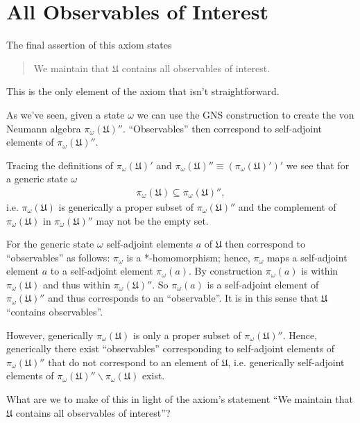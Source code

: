 \section{All Observables of Interest}\label{sctn:all-observables-of-interest}
The final assertion of this axiom states
\begin{quote}
    We maintain that $\mathfrak{U}$ contains all observables of interest.
\end{quote}
This is the only element of the axiom that isn't straightforward.

As we've seen, given a state $\omega$ we can use the GNS construction to create the von Neumann algebra $\pi_\omega(\mathfrak{U})''$. ``Observables'' then correspond to self-adjoint elements of $\pi_\omega(\mathfrak{U})''$.

Tracing the definitions of $\pi_\omega(\mathfrak{U})'$ and $\pi_\omega(\mathfrak{U})'' \equiv (\pi_\omega(\mathfrak{U})')'$ we see that for a generic state $\omega$
\begin{align}
    \pi_\omega(\mathfrak{U}) \subseteq \pi_\omega(\mathfrak{U})'',
\end{align}
i.e. $\pi_\omega(\mathfrak{U})$ is generically a proper subset of $\pi_\omega(\mathfrak{U})''$ and the complement of $\pi_\omega(\mathfrak{U})$ in $\pi_\omega(\mathfrak{U})''$ may not be the empty set.

For the generic state $\omega$ self-adjoint elements $a$ of $\mathfrak{U}$ then correspond to ``observables'' as follows: $\pi_\omega$ is a *-homomorphism; hence, $\pi_\omega$ maps a self-adjoint element $a$ to a self-adjoint element $\pi_\omega(a)$. By construction $\pi_\omega(a)$ is within $\pi_\omega(\mathfrak{U})$ and thus within $\pi_\omega(\mathfrak{U})''$. So $\pi_\omega(a)$ is a self-adjoint element of $\pi_\omega(\mathfrak{U})''$ and thus corresponds to an ``observable''. It is in this sense that $\mathfrak{U}$ ``contains observables''.

However, generically $\pi_\omega(\mathfrak{U})$ is only a proper subset of $\pi_\omega(\mathfrak{U})''$. Hence, generically there exist ``observables'' corresponding to self-adjoint elements of $\pi_\omega(\mathfrak{U})''$ that do not correspond to an element of $\mathfrak{U}$, i.e. generically self-adjoint elements of $\pi_\omega(\mathfrak{U})'' \backslash \pi_\omega(\mathfrak{U})$ exist.

What are we to make of this in light of the axiom's statement ``We maintain that $\mathfrak{U}$ contains all observables of interest''?

